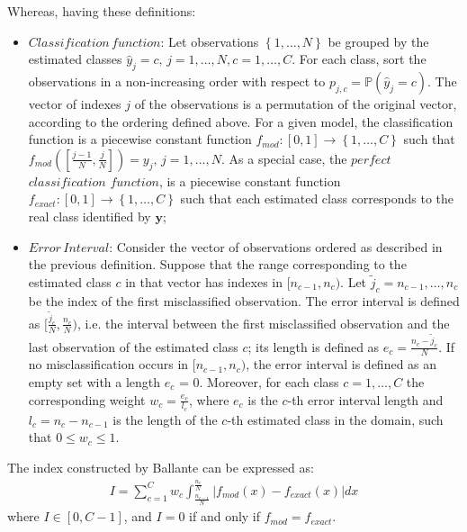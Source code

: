 Whereas, having these definitions:
\begin{itemize}
    \item \(Classification \, function\): Let observations \(\left\{ 1,\dots, N\right\}\) be grouped by the estimated classes \(\hat{y}_{j}=c, \, j=1,\dots,N, c=1,\dots,C\). For each class, sort the observations in a non-increasing order with respect to \(p_{j,c}=\mathbb{P}(\hat{y}_{j}=c)\).
    The vector of indexes \(j\) of the observations is a permutation of the original vector, according to the ordering defined above. For a given model, the classification function is a piecewise constant function \(f_{mod}:[0,1] \rightarrow \left\{ 1,\dots, C\right\} \)
    such that \(f_{mod}([\frac{j-1}{N},\frac{j}{N}])=y_j, \, j=1,\dots,N\). As a special case, the \(perfect\) \(classification\) \(function\), is a piecewise constant function \(f_{exact}:[0,1] \rightarrow \left\{ 1,\dots, C\right\} \) such that each estimated class corresponds to the real
    class identified by \(\bm{y}\);
    \item \(Error \, Interval\): Consider the vector of observations ordered as described in the previous definition. Suppose that the range corresponding to the estimated class \(c\) in that vector has indexes in \([n_{c-1}, n_c)\). Let \(\widetilde{j}_c=n_{c-1},\dots, n_c\) be the index of the first misclassified observation.
    The error interval is defined as \([\frac{\widetilde{j}_c}{N},\frac{n_c}{N})\), i.e. the interval between the first misclassified observation and the last observation of the estimated class \(c\); its length is defined as \(e_c = \frac{n_c - \widetilde{j}_c}{N}\).
    If no misclassification occurs in \([n_{c-1}, n_c)\), the error interval is defined as an empty set with a length \(e_c\) = 0.
    Moreover, for each class \(c=1,\dots,C\) the corresponding weight \(w_c=\frac{e_c}{l_c}\), where \(e_c\) is the \(c\)-th error interval length and \(l_c=n_c-n_{c-1}\) is the length of the \(c\)-th estimated class in the domain, such that \(0 \leq w_c \leq 1\).
\end{itemize}
The index constructed by Ballante can be expressed as:
\begin{equation}
    \label{eq:Ball}
    \begin{aligned}
        I = \sum_{c=1}^{C} w_{c} \int_{\frac{n_{c-1}}{N}}^{\frac{n_{c}}{N}} |f_{mod}(x)-f_{exact}(x)|dx
    \end{aligned}
\end{equation}
where \(I \in [0,C-1]\), and \(I = 0\) if and only if \(f_{mod} = f_{exact}\).

